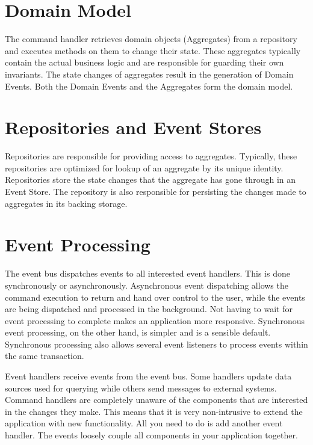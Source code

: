 \section*{Domain Model}

The command handler retrieves domain objects (Aggregates) from a repository and
executes methods on them to change their state. These aggregates typically
contain the actual business logic and are responsible for guarding their own
invariants. The state changes of aggregates result in the generation of Domain
Events. Both the Domain Events and the Aggregates form the domain model.

\section*{Repositories and Event Stores}

Repositories are responsible for providing access to aggregates. Typically,
these repositories are optimized for lookup of an aggregate by its unique
identity. Repositories store the state changes that the aggregate has gone
through in an Event Store. The repository is also responsible for persisting
the changes made to aggregates in its backing storage.

\section*{Event Processing}

The event bus dispatches events to all interested event handlers. This is done
synchronously or asynchronously. Asynchronous event dispatching allows the
command execution to return and hand over control to the user, while the events
are being dispatched and processed in the background. Not having to wait for
event processing to complete makes an application more responsive. Synchronous
event processing, on the other hand, is simpler and is a sensible
default. Synchronous processing also allows several event listeners to process
events within the same transaction.

Event handlers receive events from the event bus. Some handlers update data
sources used for querying while others send messages to external
systems. Command handlers are completely unaware of the components that are
interested in the changes they make. This means that it is very non-intrusive
to extend the application with new functionality. All you need to do is add
another event handler. The events loosely couple all components in your
application together.

